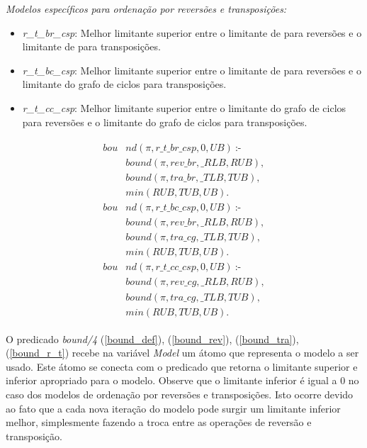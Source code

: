 \textit{Modelos específicos para ordenação por reversões e transposições:} 
\begin{itemize}
\item{\textit{r\_t\_br\_csp}: 
Melhor limitante superior entre o limitante de \bkp{} para reversões e
o limitante de \bkp{} para transposições.}
\item{\textit{r\_t\_bc\_csp}:
Melhor limitante superior entre o limitante de \bkp{} para reversões e
o limitante do grafo de ciclos para transposições.}
\item{\textit{r\_t\_cc\_csp}: 
Melhor limitante superior entre o limitante do grafo de ciclos para
reversões e o limitante do grafo de ciclos para transposições.}
\end{itemize}
\begin{align}
  \label{bound_r_t}
  \begin{split}
  \textit{bou}&\textit{nd}(\pi, r\_t\_br\_csp, 0, UB)~\text{:-} \\
  &\textit{bound}(\pi, rev\_br, \_RLB, RUB), \\
  &\textit{bound}(\pi, tra\_br, \_TLB, TUB), \\
  &\textit{min}(RUB, TUB, UB). \\
  \textit{bou}&\textit{nd}(\pi, r\_t\_bc\_csp, 0, UB)~\text{:-} \\
  &\textit{bound}(\pi, rev\_br, \_RLB, RUB), \\
  &\textit{bound}(\pi, tra\_cg, \_TLB, TUB), \\
  &\textit{min}(RUB, TUB, UB). \\
  \textit{bou}&\textit{nd}(\pi, r\_t\_cc\_csp, 0, UB)~\text{:-} \\
  &\textit{bound}(\pi, rev\_cg, \_RLB, RUB), \\
  &\textit{bound}(\pi, tra\_cg, \_TLB, TUB), \\
  &\textit{min}(RUB, TUB, UB).
  \end{split}
\end{align}

O predicado \textit{bound/4} (\ref{bound_def}), (\ref{bound_rev}),
(\ref{bound_tra}), (\ref{bound_r_t}) recebe na variável \textit{Model}
um átomo que representa o modelo a ser usado. Este átomo se conecta
com o predicado que retorna o limitante superior e inferior apropriado
para o modelo. Observe que o limitante inferior é igual a $0$ no caso
dos modelos de ordenação por reversões e transposições. Isto ocorre
devido ao fato que a cada nova iteração do modelo pode surgir um
limitante inferior melhor, simplesmente fazendo a troca entre as
operações de reversão e transposição.

